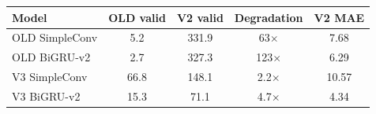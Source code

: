 \begin{tabular}{lcccc}
\toprule
Model & OLD valid & V2 valid & Degradation & V2 MAE \\
\midrule
OLD SimpleConv & 5.2 & 331.9 & 63$\times$ & 7.68 \\
OLD BiGRU-v2 & 2.7 & 327.3 & 123$\times$ & 6.29 \\
V3 SimpleConv & 66.8 & 148.1 & 2.2$\times$ & 10.57 \\
V3 BiGRU-v2 & 15.3 & 71.1 & 4.7$\times$ & 4.34 \\
\bottomrule
\end{tabular}
